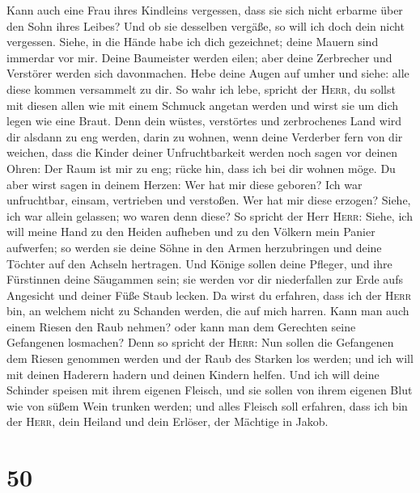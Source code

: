  Kann auch eine Frau ihres Kindleins vergessen, dass sie
sich nicht erbarme über den Sohn ihres Leibes? Und ob sie desselben
vergäße, so will ich doch dein nicht vergessen.  Siehe,
in die Hände habe ich dich gezeichnet; deine Mauern sind immerdar vor
mir.  Deine Baumeister werden eilen; aber deine
Zerbrecher und Verstörer werden sich davonmachen.  Hebe
deine Augen auf umher und siehe: alle diese kommen versammelt zu dir. So
wahr ich lebe, spricht der \textsc{Herr}, du sollst mit diesen allen wie
mit einem Schmuck angetan werden und wirst sie um dich legen wie eine
Braut.  Denn dein wüstes, verstörtes und zerbrochenes
Land wird dir alsdann zu eng werden, darin zu wohnen, wenn deine
Verderber fern von dir weichen,  dass die Kinder deiner
Unfruchtbarkeit werden noch sagen vor deinen Ohren: Der Raum ist mir zu
eng; rücke hin, dass ich bei dir wohnen möge.  Du aber
wirst sagen in deinem Herzen: Wer hat mir diese geboren? Ich war
unfruchtbar, einsam, vertrieben und verstoßen. Wer hat mir diese
erzogen? Siehe, ich war allein gelassen; wo waren denn diese?
 So spricht der Herr \textsc{Herr}: Siehe, ich will meine
Hand zu den Heiden aufheben und zu den Völkern mein Panier aufwerfen; so
werden sie deine Söhne in den Armen herzubringen und deine Töchter auf
den Achseln hertragen.  Und Könige sollen deine Pfleger,
und ihre Fürstinnen deine Säugammen sein; sie werden vor dir
niederfallen zur Erde aufs Angesicht und deiner Füße Staub lecken. Da
wirst du erfahren, dass ich der \textsc{Herr} bin, an welchem nicht zu
Schanden werden, die auf mich harren.  Kann man auch
einem Riesen den Raub nehmen? oder kann man dem Gerechten seine
Gefangenen losmachen?  Denn so spricht der \textsc{Herr}:
Nun sollen die Gefangenen dem Riesen genommen werden und der Raub des
Starken los werden; und ich will mit deinen Haderern hadern und deinen
Kindern helfen.  Und ich will deine Schinder speisen mit
ihrem eigenen Fleisch, und sie sollen von ihrem eigenen Blut wie von
süßem Wein trunken werden; und alles Fleisch soll erfahren, dass ich bin
der \textsc{Herr}, dein Heiland und dein Erlöser, der Mächtige in Jakob.

\hypertarget{section-49}{%
\section{50}\label{section-49}}

